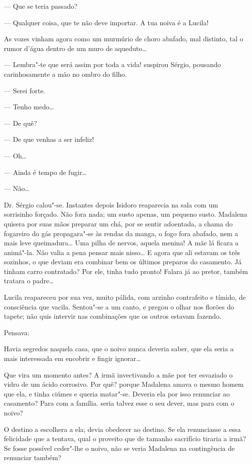 --- Que se teria passado?

--- Qualquer coisa, que te não deve importar. A tua noiva é a Lucila!

As vozes vinham agora como um murmúrio de choro abafado, mal distinto,
tal o rumor d'água dentro de um muro de aqueduto\ldots{}

--- Lembra"-te que será assim por toda a vida! suspirou Sérgio, pousando
carinhosamente a mão no ombro do filho.

--- Serei forte.

--- Tenho medo\ldots{}

--- De quê?

--- De que venhas a ser infeliz!

--- Oh\ldots{}

--- Ainda é tempo de fugir\ldots{}

--- Não\ldots{}

Dr. Sérgio calou"-se. Instantes depois Isidoro reaparecia na sala com um
sorrisinho forçado. Não fora nada; um susto apenas, um pequeno susto.
Madalena quisera por suas mãos preparar um chá, por se sentir adoentada,
a chama do fogareiro do gás propagara"-se às rendas da manga, o fogo fora
abafado, nem a mais leve queimadura\ldots{} Uma pilha de nervos, aquela
menina! A mãe lá ficara a animá"-la. Não valia a pena pensar mais
nisso\ldots{} E agora que ali estavam os três sozinhos, o que deviam era
combinar bem os últimos preparos do casamento. Já tinham carro
contratado? Por ele, tinha tudo pronto! Falara já ao pretor, também
tratara o padre\ldots{}

Lucila reapareceu por sua vez, muito pálida, com arzinho contrafeito e
tímido, de consciência que vacila. Sentou"-se a um canto, e pregou o
olhar nos florões do tapete; não quis intervir nas combinações que os
outros estavam fazendo.

Pensava:

Havia segredos naquela casa, que o noivo nunca deveria saber, que ela
seria a mais interessada em encobrir e fingir ignorar\ldots{}

Que vira um momento antes? A irmã invectivando a mãe por ter esvaziado o
vidro de um ácido corrosivo. Por quê? porque Madalena amava o mesmo
homem que ela, e tinha ciúmes e queria matar"-se. Deveria ela por isso
renunciar ao casamento? Para com a família. seria talvez esse o seu
dever, mas para com o noivo?

O destino a escolhera a ela; devia obedecer ao destino. Se ela
renunciasse a essa felicidade que a tentava, qual o proveito que de
tamanho sacrifício tiraria a irmã? Se fosse possível ceder"-lhe o noivo,
não se veria Madalena na contingência de renunciar também?


